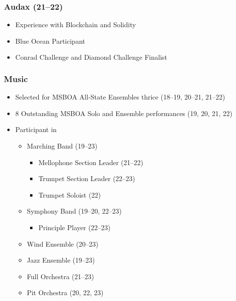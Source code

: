\documentclass[12pt, twocolumn]{article}
\begin{document}
{				\subsubsection*{Audax (21--22)}
					\begin{itemize}
						\item
							Experience with Blockchain and Solidity
						\item
							Blue Ocean Participant
						\item
							Conrad Challenge and Diamond Challenge Finalist
					\end{itemize}
				\subsubsection*{Music}
					\begin{itemize}
						\item 
							Selected for MSBOA All-State Ensembles thrice (18--19, 20--21, 21--22)
						\item
							8 Outstanding MSBOA Solo and Ensemble performances (19, 20, 21, 22)
						\item
							Participant in 
							\begin{itemize}[leftmargin = 13.5pt]
								\item
									Marching Band (19--23)
									\begin{itemize}[leftmargin = 13.5pt]
										\item
											Mellophone Section Leader (21--22)
										\item
											Trumpet Section Leader (22--23)
										\item
											Trumpet Soloist (22)
									\end{itemize}
								\item
									Symphony Band (19--20, 22--23)
									\begin{itemize}[leftmargin = 13.5pt]
										\item
											Principle Player (22--23)
									\end{itemize}
								\item
									Wind Ensemble (20--23)
								\item
									Jazz Ensemble (19--23)
								\item
									Full Orchestra (21--23)
								\item
									Pit Orchestra (20, 22, 23)

							\end{itemize}
					\end{itemize}
}
\end{document}
